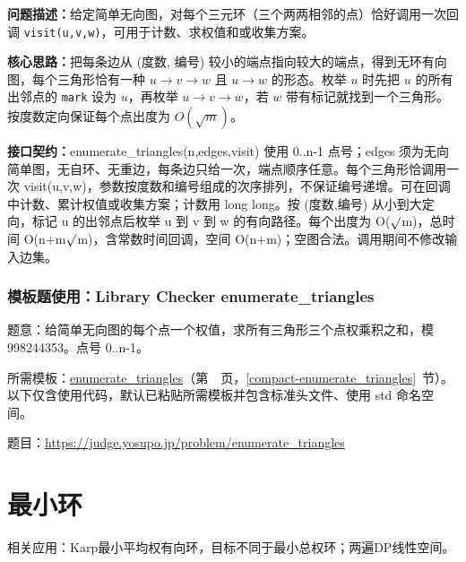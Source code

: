 \noindent\textbf{问题描述：}\allowbreak 给定简单无向图，对每个三元环（三个两两相邻的点）恰好调用一次回调 \texttt{visit(u,v,w)}，可用于计数、求权值和或收集方案。

\textbf{核心思路：}\allowbreak 把每条边从 (度数, 编号) 较小的端点指向较大的端点，得到无环有向图，每个三角形恰有一种 $u\to v\to w$ 且 $u\to w$ 的形态。枚举 $u$ 时先把 $u$ 的所有出邻点的 \texttt{mark} 设为 $u$，再枚举 $u\to v\to w$，若 $w$ 带有标记就找到一个三角形。按度数定向保证每个点出度为 $O(\sqrt m)$。



{\sloppy{}\noindent\textbf{接口契约：}enumerate\_triangles(n,edges,visit) 使用 0..n-1 点号；edges 须为无向简单图，无自环、无重边，每条边只给一次，端点顺序任意。每个三角形恰调用一次 visit(u,v,w)，参数按度数和编号组成的次序排列，不保证编号递增。可在回调中计数、累计权值或收集方案；计数用 long long。按 (度数,编号) 从小到大定向，标记 u 的出邻点后枚举 u 到 v 到 w 的有向路径。每个出度为 O($\sqrt{\vphantom x}$m)，总时间 O(n+m$\sqrt{\vphantom x}$m)，含常数时间回调，空间 O(n+m)；空图合法。调用期间不修改输入边集。\par}



\Needspace{355pt}

\subsection*{模板题使用：Library Checker enumerate\_triangles}

\label{usage-example-6}

题意：给简单无向图的每个点一个权值，求所有三角形三个点权乘积之和，模 998244353。点号 0..n-1。

所需模板：\hyperref[compact-enumerate_triangles]{enumerate\_\allowbreak{}triangles}（第~\pageref{compact-enumerate_triangles}~页，\ref{compact-enumerate_triangles}~节）。以下仅含使用代码，默认已粘贴所需模板并包含标准头文件、使用 std 命名空间。

题目：\url{https://judge.yosupo.jp/problem/enumerate_triangles}



\Needspace{180pt}

\chapter{最小环}

\noindent 相关应用：Karp最小平均权有向环，目标不同于最小总权环；两遍DP线性空间。

